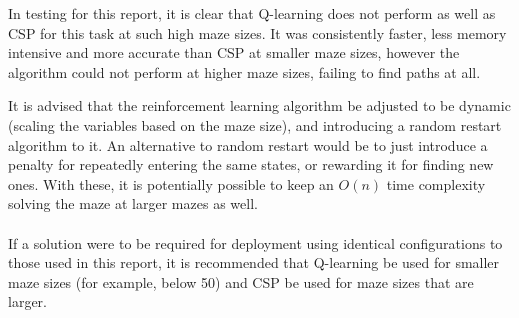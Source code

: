 \documentclass{article}
\newcommand\tab[1][1cm]{\hspace*{#1}}
\begin{document}
        \tab In testing for this report, it is clear that Q-learning does not 
        perform as well as CSP for this task at such high maze sizes. 
        It was consistently faster, less memory intensive and more accurate 
        than CSP at smaller maze sizes, however the algorithm could not perform 
        at higher maze sizes, failing to find paths at all.

        \tab It is advised that the reinforcement learning algorithm be adjusted
        to be dynamic (scaling the variables based on the maze size), and
        introducing a random restart algorithm to it. An alternative to random
        restart would be to just introduce a penalty for repeatedly entering the
        same states, or rewarding it for finding new ones. With these, it is
        potentially possible to keep an $O(n)$ time complexity solving the maze at
        larger mazes as well.
        \\ \\
        If a solution were to be required for deployment using identical 
        configurations to those used in this report, it is recommended that 
        Q-learning be used for smaller maze sizes (for example, below 50) and 
        CSP be used for maze sizes that are larger.

    
    
\end{document}
